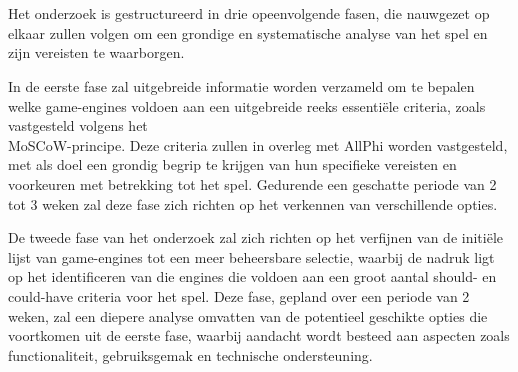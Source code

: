 
\chapter{}%
\label{ch:methodologie}


Het onderzoek is gestructureerd in drie opeenvolgende fasen, die nauwgezet op elkaar zullen volgen om een grondige en systematische analyse van het spel en zijn vereisten te waarborgen.

In de eerste fase zal uitgebreide informatie worden verzameld om te bepalen welke game-engines voldoen aan een uitgebreide reeks essentiële criteria, zoals vastgesteld volgens het \\MoSCoW-principe. Deze criteria zullen in overleg met AllPhi worden vastgesteld, met als doel een grondig begrip te krijgen van hun specifieke vereisten en voorkeuren met betrekking tot het spel. Gedurende een geschatte periode van 2 tot 3 weken zal deze fase zich richten op het verkennen van verschillende opties.

De tweede fase van het onderzoek zal zich richten op het verfijnen van de initiële lijst van game-engines tot een meer beheersbare selectie, waarbij de nadruk ligt op het identificeren van die engines die voldoen aan een groot aantal should- en could-have criteria voor het spel. Deze fase, gepland over een periode van 2 weken, zal een diepere analyse omvatten van de potentieel geschikte opties die voortkomen uit de eerste fase, waarbij aandacht wordt besteed aan aspecten zoals functionaliteit, gebruiksgemak en technische ondersteuning.


